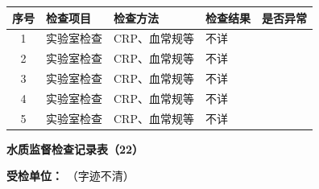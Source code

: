 \documentclass[UTF8,10pt,a4paper,fontset=fandol]{ctexart}
\newcommand{\fieldvalue}[1]{#1}
\newcommand{\handwritten}[1]{#1}
\begin{document}
\begin{tabularx}{\textwidth}{|c|X|X|X|c|}
\hline
序号 & 检查项目 & 检查方法 & 检查结果 & 是否异常 \\
\hline
1 & 实验室检查 & CRP、血常规等 & 
\fieldvalue{\handwritten{不详}} &
\fieldvalue{\handwritten{\checkmark}} \\
\hline
2 & 实验室检查 & CRP、血常规等 & 
\fieldvalue{\handwritten{不详}} &
\fieldvalue{\handwritten{\checkmark}} \\
\hline
3 & 实验室检查 & CRP、血常规等 & 
\fieldvalue{\handwritten{不详}} &
\fieldvalue{\handwritten{\checkmark}} \\
\hline
4 & 实验室检查 & CRP、血常规等 & 
\fieldvalue{\handwritten{不详}} &
\fieldvalue{\handwritten{\checkmark}} \\
\hline
5 & 实验室检查 & CRP、血常规等 & 
\fieldvalue{\handwritten{不详}} &
\fieldvalue{\handwritten{\checkmark}} \\
\hline
\end{tabularx}


\newpage

\begin{center}
\textbf{水质监督检查记录表（22）}
\end{center}

\noindent
\textbf{受检单位：}
\fieldvalue{\handwritten{（字迹不清）}}
\end{document}
